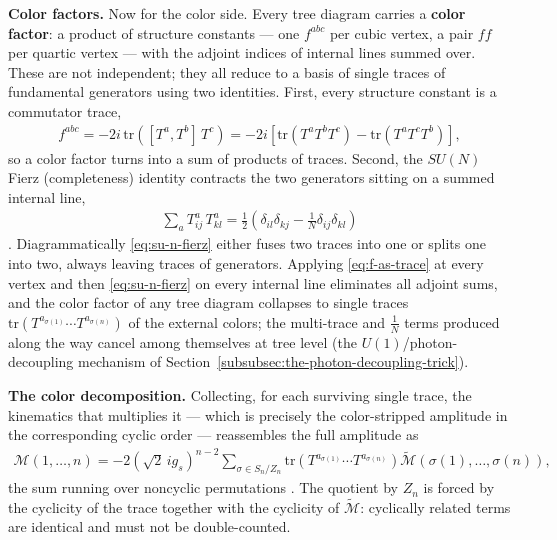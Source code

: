 \textbf{Color factors.} Now for the color side. Every tree diagram carries a \textbf{color factor}: a product of structure constants --- one $f^{abc}$ per cubic vertex, a pair $ff$ per quartic vertex --- with the adjoint indices of internal lines summed over. These are not independent; they all reduce to a basis of single traces of fundamental generators using two identities. First, every structure constant is a commutator trace,
\begin{align}
    \label{eq:f-as-trace}
    f^{abc} = -2 i\, \mathrm{tr}\!\left([T^a, T^b]\,T^c\right)
    = -2 i\left[ \mathrm{tr}(T^a T^b T^c) - \mathrm{tr}(T^a T^c T^b) \right],
\end{align}
so a color factor turns into a sum of products of traces. Second, the $SU(N)$ Fierz (completeness) identity contracts the two generators sitting on a summed internal line,
\begin{align}
    \label{eq:su-n-fierz}
    \sum_a T^a_{ij}\, T^a_{kl} = \tfrac{1}{2}\left(\delta_{il}\delta_{kj} - \tfrac{1}{N}\delta_{ij}\delta_{kl}\right)
\end{align}
\autocite[(27.49--27.50)]{schwartzQFT2014}. Diagrammatically \eqref{eq:su-n-fierz} either fuses two traces into one or splits one into two, always leaving traces of generators. Applying \eqref{eq:f-as-trace} at every vertex and then \eqref{eq:su-n-fierz} on every internal line eliminates all adjoint sums, and the color factor of any tree diagram collapses to single traces $\mathrm{tr}(T^{a_{\sigma(1)}}\cdots T^{a_{\sigma(n)}})$ of the external colors; the multi-trace and $\tfrac{1}{N}$ terms produced along the way cancel among themselves at tree level (the $U(1)$/photon-decoupling mechanism of Section~\ref{subsubsec:the-photon-decoupling-trick}).

\textbf{The color decomposition.} Collecting, for each surviving single trace, the kinematics that multiplies it --- which is precisely the color-stripped amplitude in the corresponding cyclic order --- reassembles the full amplitude as
\begin{align}
    \label{eq:color-decomposition}
    \mathcal{M}(1, \ldots, n) = -2\left(\sqrt{2}\, i g_s\right)^{n-2}
    \sum_{\sigma \in S_n / Z_n}
    \mathrm{tr}\!\left(T^{a_{\sigma(1)}} \cdots T^{a_{\sigma(n)}}\right)
    \widetilde{\mathcal{M}}\!\left(\sigma(1), \ldots, \sigma(n)\right),
\end{align}
the sum running over noncyclic permutations \autocite[(27.84)]{schwartzQFT2014}. The quotient by $Z_n$ is forced by the cyclicity of the trace together with the cyclicity of $\widetilde{\mathcal{M}}$: cyclically related terms are identical and must not be double-counted.

